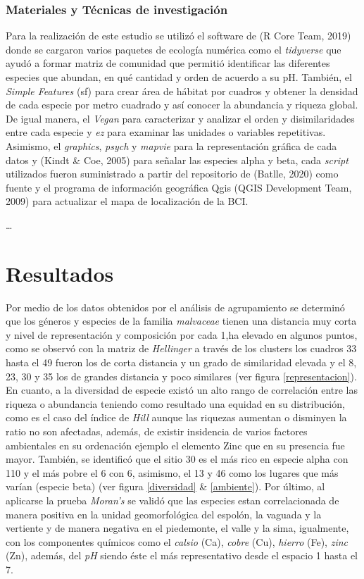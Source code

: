 \documentclass[11pt,]{article}
\begin{document}
\subsubsection{Materiales y Técnicas de
investigación}\label{materiales-y-tuxe9cnicas-de-investigaciuxf3n}

Para la realización de este estudio se utilizó el software de (R Core
Team, 2019) donde se cargaron varios paquetes de ecología numérica como
el \emph{tidyverse} que ayudó a formar matriz de comunidad que permitió
identificar las diferentes especies que abundan, en qué cantidad y orden
de acuerdo a su pH. También, el \emph{Simple Features} (sf) para crear
área de hábitat por cuadros y obtener la densidad de cada especie por
metro cuadrado y así conocer la abundancia y riqueza global. De igual
manera, el \emph{Vegan} para caracterizar y analizar el orden y
disimilaridades entre cada especie y \emph{ez} para examinar las
unidades o variables repetitivas. Asimismo, el \emph{graphics},
\emph{psych} y \emph{mapvie} para la representación gráfica de cada
datos y (Kindt \& Coe, 2005) para señalar las especies alpha y beta,
cada \emph{script} utilizados fueron suministrado a partir del
repositorio de (Batlle, 2020) como fuente y el programa de información
geográfica Qgis (QGIS Development Team, 2009) para actualizar el mapa de
localización de la BCI.

\ldots

\section{Resultados}\label{resultados}

Por medio de los datos obtenidos por el análisis de agrupamiento se
determinó que los géneros y especies de la familia \emph{malvaceae}
tienen una distancia muy corta y nivel de representación y composición
por cada 1,ha elevado en algunos puntos, como se observó con la matriz
de \emph{Hellinger} a través de los clusters los cuadros 33 hasta el 49
fueron los de corta distancia y un grado de similaridad elevada y el 8,
23, 30 y 35 los de grandes distancia y poco similares (ver figura
\ref{representacion}). En cuanto, a la diversidad de especie existó un
alto rango de correlación entre las riqueza o abundancia teniendo como
resultado una equidad en su distribución, como es el caso del índice de
\emph{Hill} aunque las riquezas aumentan o disminyen la ratio no son
afectadas, además, de existir insidencia de varios factores ambientales
en su ordenación ejemplo el elemento Zinc que en su presencia fue mayor.
También, se identificó que el sitio 30 es el más rico en especie alpha
con 110 y el más pobre el 6 con 6, asimismo, el 13 y 46 como los lugares
que más varían (especie beta) (ver figura \ref{diversidad} \&
\ref{ambiente}). Por último, al aplicarse la prueba \emph{Moran's} se
validó que las especies estan correlacionada de manera positiva en la
unidad geomorfológica del espolón, la vaguada y la vertiente y de manera
negativa en el piedemonte, el valle y la sima, igualmente, con los
componentes químicos como el \emph{calsio} (Ca), \emph{cobre} (Cu),
\emph{hierro} (Fe), \emph{zinc} (Zn), además, del \emph{pH} siendo éste
el más representativo desde el espacio 1 hasta el 7.
\end{document}
